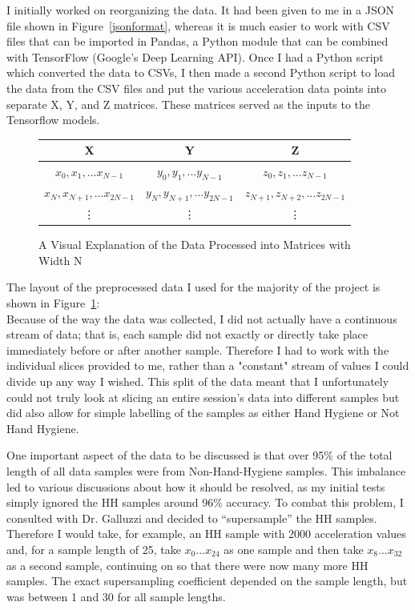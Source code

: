 \documentclass[]{report}
\begin{document}
I initially worked on reorganizing the data. It had been given to me in a JSON file shown in Figure~\ref{jsonformat}, whereas it is much easier to work with CSV files that can be imported in Pandas, a Python module that can be combined with TensorFlow (Google's Deep Learning API). Once I had a Python script which converted the data to CSVs, I then made a second Python script to load the data from the CSV files and put the various acceleration data points into separate X, Y, and Z matrices. These matrices served as the inputs to the Tensorflow models.
\begin{figure}
	\centering
	\begin{tabular}{| c | c | c |}
		\hline
		X & Y & Z\\
		\hline
		$x_{0}, x_{1}, ... x_{N-1}$ & $y_{0}, y_{1}, ... y_{N-1}$ & $z_{0}, z_{1}, ... z_{N-1}$ \\
		\hline
		$x_{N}, x_{N+1}, ... x_{2N-1}$ & $y_{N}, y_{N+1}, ... y_{2N-1}$ & $z_{N+1}, z_{N+2}, ... z_{2N-1}$ \\
		\vdots & \vdots & \vdots \\
	\end{tabular}
	\caption{A Visual Explanation of the Data Processed into Matrices with Width N}
	\label{matrixformat}
\end{figure}
The layout of the preprocessed data I used for the majority of the project is shown in Figure~\ref{matrixformat}:\\

Because of the way the data was collected, I did not actually have a continuous stream of data; that is, each sample did not exactly or directly take place immediately before or after another sample. Therefore I had to work with the individual slices provided to me, rather than a "constant" stream of values I could divide up any way I wished. This split of the data meant that I unfortunately could not truly look at slicing an entire session's data into different samples but did also allow for simple labelling of the samples as either Hand Hygiene or Not Hand Hygiene.

One important aspect of the data to be discussed is that over 95\% of the total length of all data samples were from Non-Hand-Hygiene samples. This imbalance led to various discussions about how it should be resolved, as my initial tests simply ignored the HH samples around 96\% accuracy. To combat this problem, I consulted with Dr. Galluzzi and decided to ``supersample'' the HH samples. Therefore I would take, for example, an HH sample with 2000 acceleration values and, for a sample length of 25, take $x_{0} ... x_{24}$ as one sample and then take $x_{8} ... x_{32}$ as a second sample, continuing on so that there were now many more HH samples. The exact supersampling coefficient depended on the sample length, but was between 1 and 30 for all sample lengths.
\end{document}
